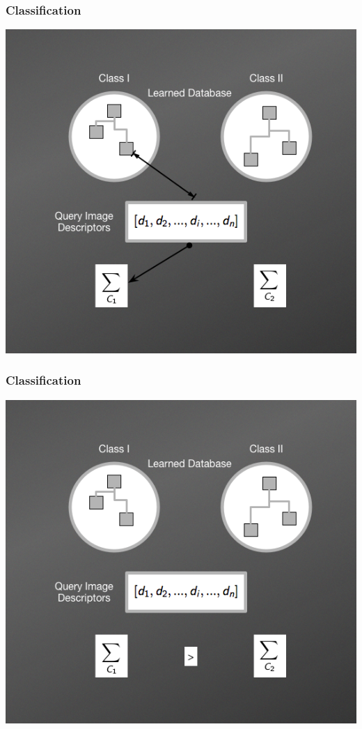 \documentclass[aspectratio=169]{beamer}
\begin{document}
    \begin{frame}
        \frametitle{Classification}
        \begin{center}
            \item \includegraphics[scale=0.38]{images/NBNNMethod3.png}    
        \end{center}
    \end{frame}    

    \begin{frame}
        \frametitle{Classification}
        \begin{center}
            \item \includegraphics[scale=0.38]{images/NBNNMethod4.png}     
        \end{center}
    \end{frame}    
    
\end{document}

